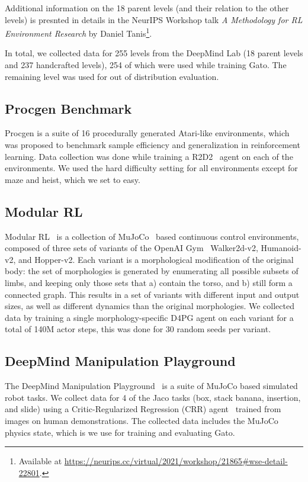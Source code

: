 \documentclass[10pt]{article} \usepackage[accepted]{tmlr}
\newcommand{\model}{{Gato}}
\begin{document}
Additional information on the 18 parent levels (and their relation to the other levels) is presnted in details in the NeurIPS Workshop talk \emph{A Methodology for RL Environment Research} by Daniel Tanis\footnote{Available at \url{https://neurips.cc/virtual/2021/workshop/21865\#wse-detail-22801}.}.


In total, we collected data for 255 levels from the DeepMind Lab (18 parent levels and 237 handcrafted levels), 254 of which were used while training \model. The remaining level was used for out of distribution evaluation.


\vskip 0.4cm
\subsection{Procgen Benchmark}
\vskip 0.2cm
Procgen \citep{cobbe2020leveraging} is a suite of 16 procedurally generated Atari-like environments, which was proposed to benchmark sample efficiency
and generalization in reinforcement learning. Data collection was done while training a R2D2~\citep{kapturowski2018recurrent} agent
on each of the environments. We used the hard difficulty setting for all environments except for maze and heist, which we set to easy.


\vskip 0.4cm
\subsection{Modular RL}
\vskip 0.2cm
Modular RL~\citep{huang2020one} is a collection of MuJoCo~\citep{todorov2012mujoco} based continuous control environments, composed of three sets of variants of the OpenAI Gym~\citep{brockman2016openai} Walker2d-v2, Humanoid-v2, and Hopper-v2.
Each variant is a morphological modification of the original body: the set of morphologies is generated by enumerating all possible subsets of limbs, and
keeping only those sets that a) contain the torso, and b) still form a connected graph.
This results in a set of variants with different input and output sizes, as well as different dynamics than the original morphologies.
We collected data by training a single morphology-specific D4PG agent on each variant for a total of 140M actor steps, this was done for 30 random seeds per variant.
\vskip 0.4cm
\subsection{DeepMind Manipulation Playground}
\vskip 0.2cm
The DeepMind Manipulation Playground~\citep{zolna2021task} is a suite of MuJoCo based simulated robot tasks.
We collect data for 4 of the Jaco tasks (box, stack banana, insertion, and slide) using a
Critic-Regularized Regression (CRR) agent~\citep{wang2020critic} trained from images on human demonstrations.
The collected data includes the MuJoCo physics state, which is we use for training and evaluating \model{}.
\vskip 0.4cm
\end{document}

